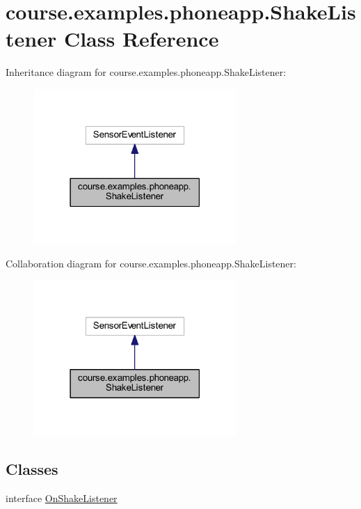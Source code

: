 \hypertarget{classcourse_1_1examples_1_1phoneapp_1_1_shake_listener}{}\section{course.\+examples.\+phoneapp.\+Shake\+Listener Class Reference}
\label{classcourse_1_1examples_1_1phoneapp_1_1_shake_listener}


Inheritance diagram for course.\+examples.\+phoneapp.\+Shake\+Listener\+:
\nopagebreak
\begin{figure}[H]
\begin{center}
\leavevmode
\includegraphics[width=219pt]{classcourse_1_1examples_1_1phoneapp_1_1_shake_listener__inherit__graph}
\end{center}
\end{figure}


Collaboration diagram for course.\+examples.\+phoneapp.\+Shake\+Listener\+:
\nopagebreak
\begin{figure}[H]
\begin{center}
\leavevmode
\includegraphics[width=219pt]{classcourse_1_1examples_1_1phoneapp_1_1_shake_listener__coll__graph}
\end{center}
\end{figure}
\subsection*{Classes}
\begin{DoxyCompactItemize}
\item 
interface \hyperlink{interfacecourse_1_1examples_1_1phoneapp_1_1_shake_listener_1_1_on_shake_listener}{On\+Shake\+Listener}
\end{DoxyCompactItemize}
